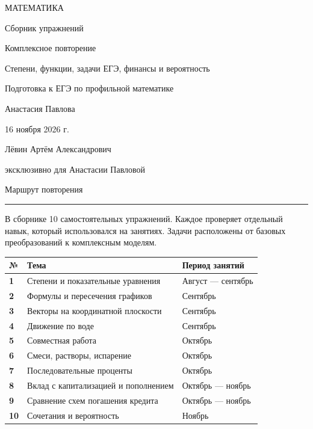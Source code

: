 \documentclass[a4paper,12pt]{article}
\newcommand{\sectionline}[1]{%
  \par\medskip\Needspace{4\baselineskip}
  {\Large\color{darkaccent}#1\par}\vspace{2mm}
  {\color{accent}\rule{\linewidth}{0.55pt}}\par\vspace{2mm}}
\begin{document}
\begin{titlepage}
\thispagestyle{empty}
\centering
\vspace*{24mm}
{\large\color{darkaccent}МАТЕМАТИКА\par}
\vspace{19mm}
{\LARGE Сборник упражнений\par}
\vspace{12mm}
{\LARGE\color{accent}Комплексное повторение\par}
\vspace{5mm}
{\large Степени, функции, задачи ЕГЭ, финансы и вероятность\par}
\vspace{14mm}
{\normalsize Подготовка к ЕГЭ по профильной математике\par}
\vfill
{\large Анастасия Павлова\par}
\vspace{10mm}
{\normalsize 16 ноября 2026 г.\par}
\vspace{20mm}
{\small Лёвин Артём Александрович\par}
{\small эксклюзивно для Анастасии Павловой\par}
\vspace{16mm}
\end{titlepage}

\sectionline{Маршрут повторения}
В сборнике 10 самостоятельных упражнений. Каждое проверяет отдельный навык, который использовался на занятиях. Задачи расположены от базовых преобразований к комплексным моделям.

\vspace{4mm}
\renewcommand{\arraystretch}{1.5}
\begin{tabularx}{\linewidth}{@{}>{\bfseries}p{8mm}X p{36mm}@{}}
\toprule
№ & Тема & Период занятий \\
\midrule
1 & Степени и показательные уравнения & Август — сентябрь \\
2 & Формулы и пересечения графиков & Сентябрь \\
3 & Векторы на координатной плоскости & Сентябрь \\
4 & Движение по воде & Сентябрь \\
5 & Совместная работа & Октябрь \\
6 & Смеси, растворы, испарение & Октябрь \\
7 & Последовательные проценты & Октябрь \\
8 & Вклад с капитализацией и пополнением & Октябрь — ноябрь \\
9 & Сравнение схем погашения кредита & Октябрь — ноябрь \\
10 & Сочетания и вероятность & Ноябрь \\
\bottomrule
\end{tabularx}
\end{document}
